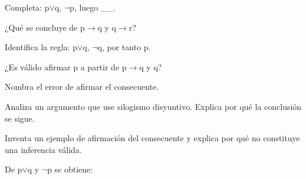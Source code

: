 \begin{activity}[id=dia-11-corta-02,type=short,weight=1]

Completa: p\(\lor\)q, \(\neg\)p, luego __.

\end{activity}

\begin{activity}[id=dia-11-corta-03,type=short,weight=1]

¿Qué se concluye de p\(\to\)q y q\(\to\)r?

\end{activity}

\begin{activity}[id=dia-11-corta-04,type=short,weight=1]

Identifica la regla: p\(\lor\)q, \(\neg\)q, por tanto p.

\end{activity}

\begin{activity}[id=dia-11-corta-05,type=short,weight=1]

¿Es válido afirmar p a partir de p\(\to\)q y q?

\end{activity}

\begin{activity}[id=dia-11-corta-06,type=short,weight=1]

Nombra el error de afirmar el consecuente.

\end{activity}

\begin{activity}[id=dia-11-desarrollo-01,type=long,weight=2]

Analiza un argumento que use silogismo disyuntivo. Explica por qué la conclusión se sigue.

\end{activity}

\begin{activity}[id=dia-11-desarrollo-02,type=long,weight=2]

Inventa un ejemplo de afirmación del consecuente y explica por qué no constituye una inferencia válida.

\end{activity}

\begin{activity}[id=dia-11-opcion-01,type=choice,weight=1]

De p\(\lor\)q y \(\neg\)p se obtiene:





\end{activity}

